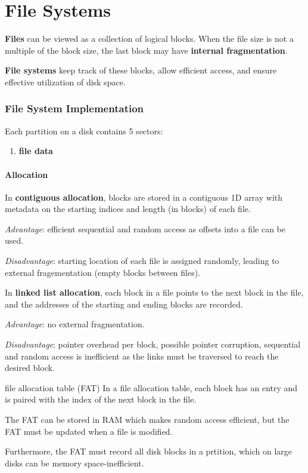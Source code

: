 \part{File Systems}
\textbf{Files} can be viewed as a collection of logical blocks.
When the file size is not a multiple of the block size, the last block may have \textbf{internal fragmentation}.

\textbf{File systems} keep track of these blocks, allow efficient access, and ensure effective utilization of disk space.


\section{File System Implementation}
Each partition on a disk contains 5 sectors:
\begin{enumerate}
    \item{\textbf{file data}}
\end{enumerate}

\subsection{Allocation}
In \textbf{contiguous allocation}, blocks are stored in a contiguous 1D array with metadata on the starting indices and length (in blocks) of each file.

\textit{Advantage}: efficient sequential and random access as offsets into a file can be used.

\textit{Disadvantage}: starting location of each file is assigned randomly, leading to external fragementation (empty blocks between files).

In \textbf{linked list allocation}, each block in a file points to the next block in the file, and the addresses of the starting and ending blocks are recorded.

\textit{Advantage}: no external fragmentation.

\textit{Disadvantage}: pointer overhead per block, possible pointer corruption, sequential and random access is inefficient as the links must be traversed to reach the desired block.

\begin{defn}{file allocation table (FAT)}
    In a file allocation table, each block has an entry and is paired with the index of the next block in the file.

    The FAT can be stored in RAM which makes random access efficient, but the FAT must be updated when a file is modified.

    Furthermore, the FAT must record all disk blocks in a prtition, which on large disks can be memory space-inefficient.
\end{defn}

